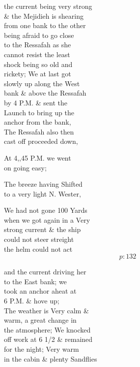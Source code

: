 \documentclass{report}
\begin{document}

	\par{
 	the current being very strong\ \\\& the Mejidieh is shearing\ \\from one bank to the other\ \\being afraid to go close\ \\to the Ressafah as she\ \\cannot resist the least\ \\shock being so old and\ \\rickety; We at last got\ \\slowly up along the West\ \\bank \& above the Ressafah\ \\by 4 P.M. \& sent the\ \\Launch to bring up the\ \\anchor from the bank,\ \\The Ressafah also then\ \\cast off proceeded down,\ \\
	}

	\par{
 	At 4,,45 P.M. we went\ \\on going easy;\ \\
	}

	\par{
 	The breeze having Shifted\ \\to a very light N. Wester,\ \\
	}

	\par{
 	We had not gone 100 Yards\ \\when we got again in a Very\ \\strong current \& the ship\ \\could not steer streight\ \\the helm could not act\ \\
  \[p: 132 \]

	}

	\par{
 	and the current driving her\ \\to the East bank; we\ \\took an anchor aheat at\ \\6 P.M. \& hove up;\ \\The weather is Very calm \&\ \\warm, a great change in\ \\the atmosphere; We knocked\ \\off work at 6 1/2 \& remained\ \\for the night; Very warm\ \\in the cabin \& plenty Sandflies\ \\
	}
\end{document}
